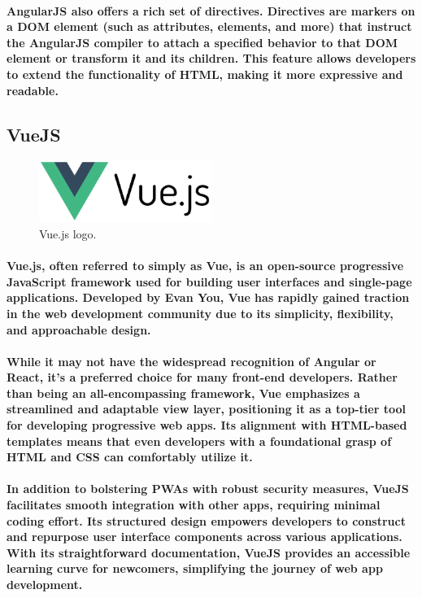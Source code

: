 \documentclass[12pt,a4paper]{article}
\begin{document}
    \paragraph{AngularJS also offers a rich set of directives. Directives are markers on a DOM element (such as attributes, elements, and more) that instruct the AngularJS compiler to attach a specified behavior to that DOM element or transform it and its children. This feature allows developers to extend the functionality of HTML, making it more expressive and readable.}

    \subsection{VueJS}

    \begin{figure}[h!]
      \centering
      \includegraphics[width=0.5\textwidth]{vue.png}
      \caption{Vue.js logo.}
    \end{figure}

    \paragraph{Vue.js, often referred to simply as Vue, is an open-source progressive JavaScript framework used for building user interfaces and single-page applications. Developed by Evan You, Vue has rapidly gained traction in the web development community due to its simplicity, flexibility, and approachable design.}
    
    \paragraph{While it may not have the widespread recognition of Angular or React, it’s a preferred choice for many front-end developers. Rather than being an all-encompassing framework, Vue emphasizes a streamlined and adaptable view layer, positioning it as a top-tier tool for developing progressive web apps. Its alignment with HTML-based templates means that even developers with a foundational grasp of HTML and CSS can comfortably utilize it.}
    
    \paragraph{In addition to bolstering PWAs with robust security measures, VueJS facilitates smooth integration with other apps, requiring minimal coding effort. Its structured design empowers developers to construct and repurpose user interface components across various applications. With its straightforward documentation, VueJS provides an accessible learning curve for newcomers, simplifying the journey of web app development.}
\end{document}
